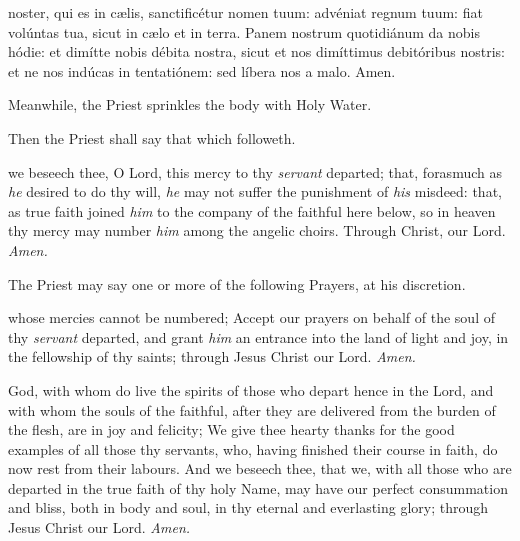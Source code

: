 { noster, qui es in c{\ae}lis, sanctificétur nomen tuum: advéniat regnum tuum: fiat volúntas tua, sicut in c{\ae}lo et in terra. Panem nostrum quotidiánum da nobis hódie: et dimítte nobis débita nostra, sicut et nos dimíttimus debitóribus nostris: et ne nos indúcas in tentatiónem: sed líbera nos a malo. Amen.}
\begin{rubric}
    Meanwhile, the Priest sprinkles the body with Holy Water.
\end{rubric}
\begin{rubric}
	Then the Priest shall say that which followeth.
\end{rubric}
 we beseech thee, O Lord, this mercy to thy \textit{servant} departed; that, forasmuch as \textit{he} desired to do thy will, \textit{he} may not suffer the punishment of \textit{his} misdeed: that, as true faith joined \textit{him} to the company of the faithful here below, so in heaven thy mercy may number \textit{him} among the angelic choirs. Through Christ, our Lord. \textit{Amen.}
\begin{rubric}
    The Priest may say one or more of the following Prayers, at his discretion.
\end{rubric}\par
{}
 whose mercies cannot be numbered; Accept our prayers on behalf of the soul of thy \textit{servant} departed, and grant \textit{him} an entrance into the land of light and joy, in the fellowship of thy saints; through Jesus Christ our Lord. \textit{Amen.}\par
{}
 God, with whom do live the spirits of those who depart hence in the Lord, and with whom the souls of the faithful, after they are delivered from the burden of the flesh, are in joy and felicity; We give thee hearty thanks for the good examples of all those thy servants, who, having finished their course in faith, do now rest from their labours. And we beseech thee, that we, with all those who are departed in the true faith of thy holy Name, may have our perfect consummation and bliss, both in body and soul, in thy eternal and everlasting glory; through Jesus Christ our Lord. \textit{Amen.}\par
